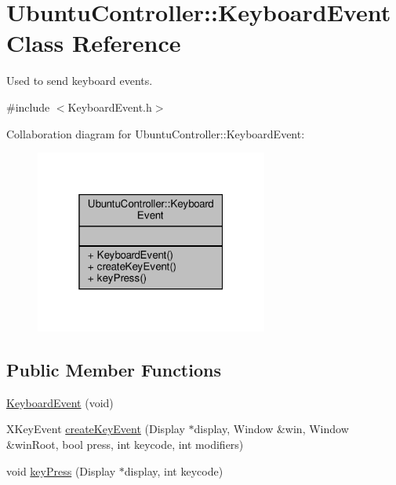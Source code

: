 \hypertarget{class_ubuntu_controller_1_1_keyboard_event}{}\section{Ubuntu\+Controller\+:\+:Keyboard\+Event Class Reference}
\label{class_ubuntu_controller_1_1_keyboard_event}


Used to send keyboard events.  




{\ttfamily \#include $<$Keyboard\+Event.\+h$>$}



Collaboration diagram for Ubuntu\+Controller\+:\+:Keyboard\+Event\+:
\nopagebreak
\begin{figure}[H]
\begin{center}
\leavevmode
\includegraphics[width=217pt]{class_ubuntu_controller_1_1_keyboard_event__coll__graph}
\end{center}
\end{figure}
\subsection*{Public Member Functions}
\begin{DoxyCompactItemize}
\item 
\hyperlink{class_ubuntu_controller_1_1_keyboard_event_a5a4efca276ce847a471b228c4a114bc7}{Keyboard\+Event} (void)
\item 
X\+Key\+Event \hyperlink{class_ubuntu_controller_1_1_keyboard_event_a84e25f7a086a015007fe877a55d9444e}{create\+Key\+Event} (Display $\ast$display, Window \&win, Window \&win\+Root, bool press, int keycode, int modifiers)
\item 
void \hyperlink{class_ubuntu_controller_1_1_keyboard_event_aea537f2a22fc1f162fd81b5d039eb053}{key\+Press} (Display $\ast$display, int keycode)
\end{DoxyCompactItemize}


